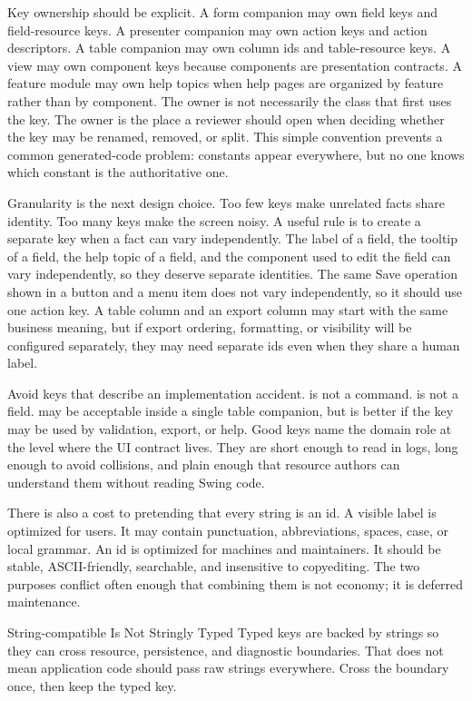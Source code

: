 Key ownership should be explicit. A form companion may own field keys and
field-resource keys. A presenter companion may own action keys and action
descriptors. A table companion may own column ids and table-resource keys. A
view may own component keys because components are presentation contracts. A
feature module may own help topics when help pages are organized by feature
rather than by component. The owner is not necessarily the class that first
uses the key. The owner is the place a reviewer should open when deciding
whether the key may be renamed, removed, or split. This simple convention
prevents a common generated-code problem: constants appear everywhere, but no
one knows which constant is the authoritative one.

Granularity is the next design choice. Too few keys make unrelated facts share
identity. Too many keys make the screen noisy. A useful rule is to create a
separate key when a fact can vary independently. The label of a field, the
tooltip of a field, the help topic of a field, and the component used to edit
the field can vary independently, so they deserve separate identities. The
same Save operation shown in a button and a menu item does not vary
independently, so it should use one action key. A table column and an export
column may start with the same business meaning, but if export ordering,
formatting, or visibility will be configured separately, they may need
separate ids even when they share a human label.

Avoid keys that describe an implementation accident.  is
not a command.  is not a field. 
may be acceptable inside a single table companion, but 
is better if the key may be used by validation, export, or help. Good keys
name the domain role at the level where the UI contract lives. They are short
enough to read in logs, long enough to avoid collisions, and plain enough that
resource authors can understand them without reading Swing code.

There is also a cost to pretending that every string is an id. A visible label
is optimized for users. It may contain punctuation, abbreviations, spaces,
case, or local grammar. An id is optimized for machines and maintainers. It
should be stable, ASCII-friendly, searchable, and insensitive to copyediting.
The two purposes conflict often enough that combining them is not economy; it
is deferred maintenance.

\begin{pitfallbox}{String-compatible Is Not Stringly Typed}
Typed keys are backed by strings so they can cross resource, persistence, and
diagnostic boundaries. That does not mean application code should pass raw
strings everywhere. Cross the boundary once, then keep the typed key.
\end{pitfallbox}


